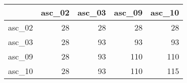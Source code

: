 \begin{tabular}{lrrrr}
\toprule
 & asc_02 & asc_03 & asc_09 & asc_10 \\
\midrule
asc_02 & 28 & 28 & 28 & 28 \\
asc_03 & 28 & 93 & 93 & 93 \\
asc_09 & 28 & 93 & 110 & 110 \\
asc_10 & 28 & 93 & 110 & 115 \\
\bottomrule
\end{tabular}
